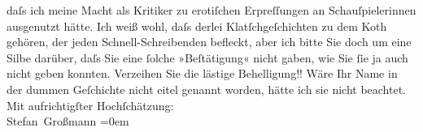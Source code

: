 \begin{ledgroupsized}[t]{13cm}
               daſs ich meine Macht als Kritiker zu erotiſchen Erpreſſungen an Schauſpielerinnen
               ausgenutzt hätte.\pend
           \pstart
           Ich weiß wohl, daſs derlei Klatſchgeſchichten zu dem Koth gehören, der jeden
               Schnell-Schreibenden befleckt, aber ich bitte Sie doch um eine Silbe darüber, daſs
               Sie eine ſolche »Beſtätigung« nicht gaben, wie Sie ſie ja auch nicht geben
               konnten.\pend
           \pstart
           Verzeihen Sie die lästige Behelligung!! Wäre Ihr Name in der dummen Geſchichte nicht
               eitel genannt worden, hätte ich sie nicht beachtet.\pend
           \pstart
           Mit aufrichtigſter Hochſchätzung:{\\[\baselineskip]}\spacefill\mbox{Stefan Großmann}\pend
           \leftskip=0em{}
         
         \endnumbering{}\end{ledgroupsized}  \newcommand{\dateiname}{L02005}\newcommand{\titel}{Stefan Großmann an Arthur Schnitzler, [7.] 2. 1911}\newcommand{\editorInnen}{Martin Anton Müller und Gerd-Hermann Susen}
      